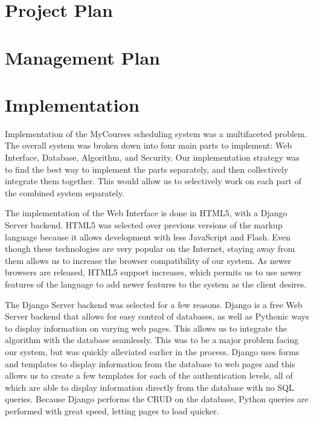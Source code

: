 \documentclass[12pt,article]{memoir}
\begin{document}
\chapter{Project Plan} %
\chapter{Management Plan} %
\chapter{Implementation} %

Implementation of the MyCourses scheduling system was a multifaceted problem. The overall system was broken down into four main parts to implement: Web Interface, Database, Algorithm, and Security. Our implementation strategy was to find the best way to implement the parts separately, and then collectively integrate them together. This would allow us to selectively work on each part of the combined system separately.

The implementation of the Web Interface is done in HTML5, with a Django Server backend. HTML5 was selected over previous versions of the markup language because it allows development with less JavaScript and Flash. Even though these technologies are very popular on the Internet, staying away from them allows us to increase the browser compatibility of our system. As newer browsers are released, HTML5 support increases, which permits us to use newer features of the language to add newer features to the system as the client desires. 

The Django Server backend was selected for a few reasons. Django is a free Web Server backend that allows for easy control of databases, as well as Pythonic ways to display information on varying web pages. This allows us to integrate the algorithm with the database seamlessly. This was to be a major problem facing our system, but was quickly alleviated earlier in the process. Django uses forms and templates to display information from the database to web pages and this allows us to create a few templates for each of the authentication levels, all of which are able to display information directly from the database with no SQL queries. Because Django performs the CRUD on the database, Python queries are performed with great speed, letting pages to load quicker.
\end{document}
